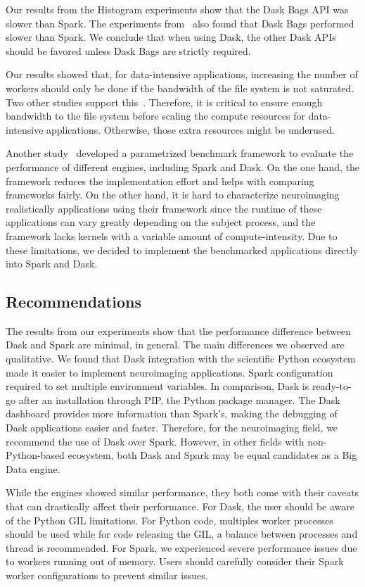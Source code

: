 \documentclass[AMA,STIX1COL]{WileyNJD-v2}
\newcommand{\HL}[1]{#1}
\begin{document}
Our results from the Histogram experiments show that the Dask Bags API was slower than Spark.
The experiments from~\cite{10.1145/3225058.3225128} also found that Dask Bags performed slower than Spark.
We conclude that when using Dask, the other Dask APIs should be favored unless Dask Bags are strictly required.
																	
Our results showed that, for data-intensive applications, increasing the number of workers should only be done if the bandwidth of the file system is not saturated.
Two other studies support this~\cite{8943502, 8588652}.
Therefore, it is critical to ensure enough bandwidth to the file system before scaling the compute resources for data-intensive applications.
Otherwise, those extra resources might be underused.

\HL{
	Another study~{\cite{9355308}} developed a parametrized benchmark framework
	to evaluate the performance of different engines, including Spark and Dask.
	On the one hand, the framework reduces the implementation effort and helps with
	comparing frameworks fairly.
	On the other hand, it is hard to characterize neuroimaging realistically
	applications using their framework since the runtime of these applications can vary
	greatly depending on the subject process, and the framework lacks kernels with
	a variable amount of compute-intensity.
	Due to these limitations, we decided to implement the benchmarked applications
	directly into Spark and Dask.
}
				
\subsection{Recommendations}
\HL{
	The results from our experiments show that the performance difference between
	Dask and Spark are minimal, in general. 
	The main differences we observed are qualitative.
	We found that Dask integration with the scientific Python ecosystem made it
	easier to implement neuroimaging applications.
	Spark configuration required to set multiple environment variables.
	In comparison, Dask is ready-to-go after an installation through PIP, the Python package manager.
	The Dask dashboard provides more information than Spark's, making
	the debugging of Dask applications easier and faster.
	Therefore, for the neuroimaging field, we recommend the use of Dask over Spark.
	However, in other fields with non-Python-based ecosystem, both Dask and Spark
	may be equal candidates as a Big Data engine.
}

\HL{
	While the engines showed similar performance, they both come with their caveats that
	can drastically affect their performance.
	For Dask, the user should be aware of the Python GIL limitations.
	For Python code, multiples worker processes should be used while for code releasing the
	GIL, a balance between processes and thread is recommended.
	For Spark, we experienced severe performance issues due to workers running out of memory.
	Users should carefully consider their Spark worker configurations to prevent similar issues.
}
											
\end{document}
